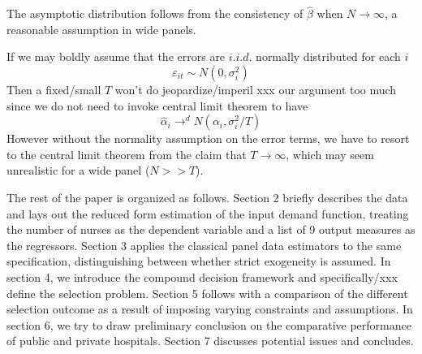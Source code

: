 \documentclass[12pt]{article}
\begin{document}
The asymptotic distribution follows from the consistency of $\hat{\beta}$ when
$N \to \infty$, a reasonable assumption in wide panels.

If we may boldly assume that the errors are $i.i.d.$ normally distributed for
each $i$
\begin{equation*}
    \varepsilon_{it} \sim N(0, \sigma_i^2)
\end{equation*}
Then a fixed/small $T$ won't do jeopardize/imperil xxx our argument too much since we do not need to invoke central
limit theorem to have
\begin{equation*}
    \hat{\alpha}_i\to^d N(\alpha_i,\sigma_i^2/T)
\end{equation*}
However without the normality assumption on the error terms, we have to resort to the
central limit theorem from the claim that $T\to \infty$, which may seem unrealistic for a wide panel ($N>>T$).

The rest of the paper is organized as follows. Section 2 briefly describes the
data and lays out the reduced form estimation of the input demand function,
treating the number of nurses as the dependent variable and a list of 9 output
measures as the regressors. Section 3 applies the classical panel data
estimators to the same specification, distinguishing between whether strict
exogeneity is assumed. In section 4, we introduce the compound decision
framework and specifically/xxx define the selection problem. Section 5 follows
with a comparison of the different selection outcome as a result of imposing
varying constraints and assumptions. In section 6, we try to draw preliminary
conclusion on the comparative performance of public and private hospitals.
Section 7 discusses potential issues and concludes.
\end{document}
